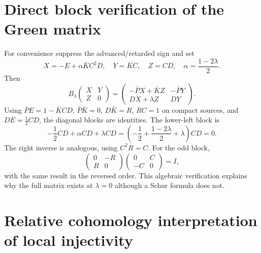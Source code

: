\documentclass[11pt]{article}
\theoremstyle{definition}
\theoremstyle{remark}
\begin{document}
\section{Direct block verification of the Green matrix}

For convenience suppress the advanced/retarded sign and set
\begin{equation}
 X=-E+\alpha\bar KC^2D,
 \quad Y=\bar KC,
 \quad Z=CD,
 \quad \alpha=\frac{1-2\lambda}{2}.
\end{equation}
Then
\begin{equation}
 B_\lambda
 \begin{pmatrix}X&Y\\Z&0\end{pmatrix}
 =
 \begin{pmatrix}
 -\bar PX+\bar KZ&-\bar PY\\
 DX+\lambda Z&DY
 \end{pmatrix}.
\end{equation}
Using $\bar PE=1-\bar KCD$, $\bar P\bar K=0$, $D\bar K=R$, $RC=1$ on compact
sources, and $DE=\tfrac12CD$, the diagonal blocks are identities.  The lower-left
block is
\begin{equation}
 -\frac12CD+\alpha CD+\lambda CD
 =\left(-\frac12+\frac{1-2\lambda}{2}+\lambda\right)CD=0.
\end{equation}
The right inverse is analogous, using $C^2R=C$.  For the odd block,
\begin{equation}
 \begin{pmatrix}0&-R\\R&0\end{pmatrix}
 \begin{pmatrix}0&C\\-C&0\end{pmatrix}=I,
\end{equation}
with the same result in the reversed order.  This algebraic verification explains why
the full matrix exists at $\lambda=0$ although a Schur formula does not.

\section{Relative cohomology interpretation of local injectivity}
\end{document}
